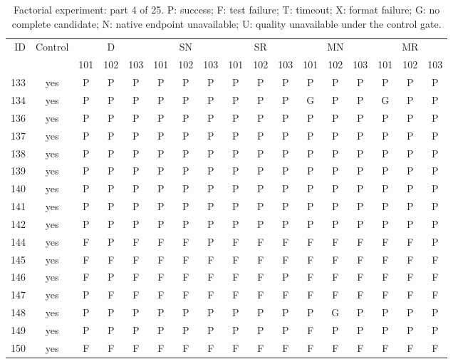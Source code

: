 \begin{table}[p]\centering\footnotesize
\setlength{\tabcolsep}{3pt}
\caption{Factorial experiment: part 4 of 25. P: success; F: test failure; T: timeout; X: format failure; G: no complete candidate; N: native endpoint unavailable; U: quality unavailable under the control gate.}
\begin{tabular*}{\textwidth}{@{\extracolsep{\fill}}rcccccccccccccccc}\toprule
ID & Control & \multicolumn{3}{c}{D} & \multicolumn{3}{c}{SN} & \multicolumn{3}{c}{SR} & \multicolumn{3}{c}{MN} & \multicolumn{3}{c}{MR}\\
\cmidrule(lr){3-5}\cmidrule(lr){6-8}\cmidrule(lr){9-11}\cmidrule(lr){12-14}\cmidrule(lr){15-17}
 & & 101 & 102 & 103 & 101 & 102 & 103 & 101 & 102 & 103 & 101 & 102 & 103 & 101 & 102 & 103\\\midrule
133 & yes & P & P & P & P & P & P & P & P & P & P & P & P & P & P & P\\
134 & yes & P & P & P & P & P & P & P & P & P & G & P & P & G & P & P\\
136 & yes & P & P & P & P & P & P & P & P & P & P & P & P & P & P & P\\
137 & yes & P & P & P & P & P & P & P & P & P & P & P & P & P & P & P\\
138 & yes & P & P & P & P & P & P & P & P & P & P & P & P & P & P & P\\
139 & yes & P & P & P & P & P & P & P & P & P & P & P & P & P & P & P\\
140 & yes & P & P & P & P & P & P & P & P & P & P & P & P & P & P & P\\
141 & yes & P & P & P & P & P & P & P & P & P & P & P & P & P & P & P\\
142 & yes & P & P & P & P & P & P & P & P & P & P & P & P & P & P & P\\
144 & yes & F & P & F & F & F & P & F & F & F & F & F & F & F & F & P\\
145 & yes & F & F & F & F & F & F & F & F & F & F & F & F & F & F & F\\
146 & yes & F & P & F & F & F & F & F & F & P & F & F & F & F & F & F\\
147 & yes & P & F & F & F & F & F & F & F & F & F & F & F & F & F & F\\
148 & yes & P & P & P & P & P & P & P & P & P & P & G & P & P & P & P\\
149 & yes & P & P & P & P & P & P & P & P & P & F & P & P & P & P & P\\
150 & yes & F & F & F & F & F & F & F & F & F & F & F & F & F & F & F\\

\end{tabular*}
\end{table}
